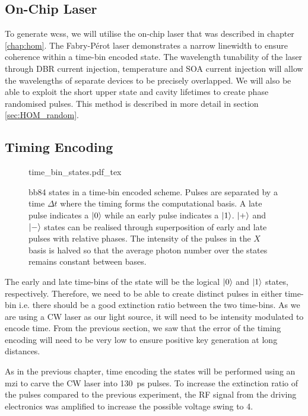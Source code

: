 \subsection{On-Chip Laser}
\begin{parahigh}
To generate \acp{wcs}, we will utilise the on-chip laser that was described in chapter \ref{chap:hom}. The Fabry-P\'{e}rot laser demonstrates a narrow linewidth to ensure coherence within a time-bin encoded state. The wavelength tunability of the laser through \ac{DBR} current injection, temperature and \ac{SOA} current injection will allow the wavelengths of separate devices to be precisely overlapped. We will also be able to exploit the short upper state and cavity lifetimes to create phase randomised pulses. This method is described in more detail in section \ref{sec:HOM_random}.
\end{parahigh}
\subsection{Timing Encoding}

\begin{figure}[t]
	\centering
	\small
	\def\svgwidth{0.9\textwidth} 
	{time_bin_states.pdf_tex}
	\caption[BB84 time-bin encoding]{\acs{bb84} states in a time-bin encoded scheme. Pulses are separated by a time $\Delta t$ where the timing forms the computational basis. A late pulse indicates a $\ket{0}$ while an early pulse indicates a $\ket{1}$. $\ket{+}$ and $\ket{-}$ states can be realised through superposition of early and late pulses with relative phases. The intensity of the pulses in the $X$ basis is halved so that the average photon number over the states remains constant between bases.}
	\label{fig:BB84_time_bin}
\end{figure}

The early and late time-bins of the state will be the logical $\ket{0}$ and $\ket{1}$ states, respectively. Therefore, we need to be able to create distinct pulses in either time-bin i.e. there should be a good extinction ratio between the two time-bins. As we are using a \ac{CW} laser as our light source, it will need to be intensity modulated to encode time. From the previous section, we saw that the error of the timing encoding will need to be very low to ensure positive key generation at long distances.

As in the previous chapter, time encoding the states will be performed using an \acl{mzi} to carve the \ac{CW} laser into \SI{130}{ps} pulses. To increase the extinction ratio of the pulses compared to the previous experiment, the RF signal from the driving electronics was amplified to increase the possible voltage swing to \SI{4}{\Vpp}. 

